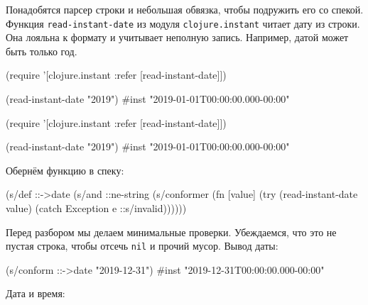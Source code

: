 
\mnoindent Понадобятся парсер строки и небольшая обвязка, чтобы подружить его со
спекой. Функция \verb|read-instant-date| из модуля \verb|clojure.instant| читает
дату из строки. Она лояльна к формату и учитывает неполную запись. Например,
датой может быть только год.


\ifx\DEVICETYPE\MOBILE

\begin{english}
  \begin{clojure}
(require '[clojure.instant
           :refer [read-instant-date]])

(read-instant-date "2019")
#inst "2019-01-01T00:00:00.000-00:00"
  \end{clojure}
\end{english}

\else

\begin{english}
  \begin{clojure}
(require '[clojure.instant :refer [read-instant-date]])

(read-instant-date "2019")
#inst "2019-01-01T00:00:00.000-00:00"
  \end{clojure}
\end{english}

\fi

Обернём функцию в спеку:

\begin{english}
  \begin{clojure}
(s/def ::->date
  (s/and
   ::ne-string
   (s/conformer
    (fn [value]
      (try
        (read-instant-date value)
        (catch Exception e
          ::s/invalid))))))
  \end{clojure}
\end{english}

Перед разбором мы делаем минимальные проверки. Убеждаемся, что это не пустая
строка, чтобы отсечь \verb|nil| и прочий мусор. Вывод даты:

\begin{english}
  \begin{clojure}
(s/conform ::->date "2019-12-31")
#inst "2019-12-31T00:00:00.000-00:00"
  \end{clojure}
\end{english}

\noindent
Дата и время:

\ifx\DEVICETYPE\MOBILE

